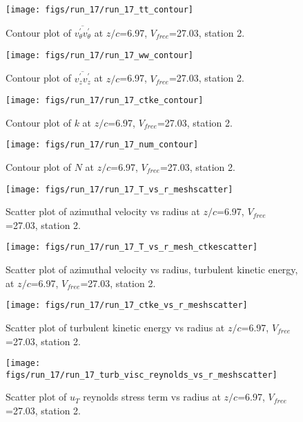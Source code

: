 \begin{figure}[H]
\centering
\texttt{[image: figs/run\_17/run\_17\_tt\_contour]}
\caption{Contour plot of $\overline{v_{\theta}^{\prime} v_{\theta}^{\prime}}$ at $z/c$=6.97, $V_{free}$=27.03, station 2.}
\end{figure}


\begin{figure}[H]
\centering
\texttt{[image: figs/run\_17/run\_17\_ww\_contour]}
\caption{Contour plot of $\overline{v_{z}^{\prime} v_{z}^{\prime}}$ at $z/c$=6.97, $V_{free}$=27.03, station 2.}
\end{figure}


\begin{figure}[H]
\centering
\texttt{[image: figs/run\_17/run\_17\_ctke\_contour]}
\caption{Contour plot of $k$ at $z/c$=6.97, $V_{free}$=27.03, station 2.}
\end{figure}


\begin{figure}[H]
\centering
\texttt{[image: figs/run\_17/run\_17\_num\_contour]}
\caption{Contour plot of $N$ at $z/c$=6.97, $V_{free}$=27.03, station 2.}
\end{figure}


\begin{figure}[H]
\centering
\texttt{[image: figs/run\_17/run\_17\_T\_vs\_r\_meshscatter]}
\caption{Scatter plot of azimuthal velocity vs radius at $z/c$=6.97, $V_{free}$=27.03, station 2.}
\end{figure}


\begin{figure}[H]
\centering
\texttt{[image: figs/run\_17/run\_17\_T\_vs\_r\_mesh\_ctkescatter]}
\caption{Scatter plot of azimuthal velocity vs radius, turbulent kinetic energy, at $z/c$=6.97, $V_{free}$=27.03, station 2.}
\end{figure}


\begin{figure}[H]
\centering
\texttt{[image: figs/run\_17/run\_17\_ctke\_vs\_r\_meshscatter]}
\caption{Scatter plot of turbulent kinetic energy vs radius at $z/c$=6.97, $V_{free}$=27.03, station 2.}
\end{figure}


\begin{figure}[H]
\centering
\texttt{[image: figs/run\_17/run\_17\_turb\_visc\_reynolds\_vs\_r\_meshscatter]}
\caption{Scatter plot of $
u_T$ reynolds stress term vs radius at $z/c$=6.97, $V_{free}$=27.03, station 2.}
\end{figure}


